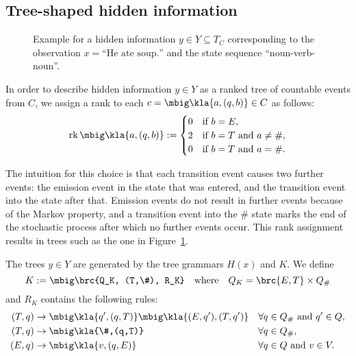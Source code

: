 \subsection{Tree-shaped hidden information}

\begin{figure}[t!]
 \centering
 \caption{Example for a hidden information $y\in Y\subseteq T_C$ corresponding
 to the observation $x = \text{``He ate soup.''}$ and the state sequence
 ``noun-verb-noun''.\label{fig:03-example-y}}
\end{figure}

In order to describe hidden information $y\in Y$ as a ranked tree of countable
events from $C$, we assign a rank to each $c = \mbig\kla{a,(q,b)}\in C$ as follows:
\begin{align*}
 \rk\mbig\kla{a,(q,b)} := \begin{cases}
  0 & \text{if } b = E, \\
  2 & \text{if } b = T \text{ and } a\neq\#, \\
  0 & \text{if } b = T \text{ and } a = \#.
 \end{cases}
\end{align*}

The intuition for this choice is that each transition event causes two further
events: the emission event in the state that was entered, and the transition
event into the state after that. Emission events do not result in further
events because of the Markov property, and a transition event into the $\#$
state marks the end of the stochastic process after which no further events
occur. This rank assignment results in trees such as the one in
Figure~\ref{fig:03-example-y}.

The trees $y\in Y$ are generated by the tree grammars $H(x)$ and $K$. We define
\[
 K := \mbig\brc{Q_K, (T,\#), R_K} \quad\text{where}\quad Q_K = \brc{E,T} \times Q_\#
\]
and $R_K$ contains the following rules:
\begin{align*}
 (T,q) &\to \mbig\kla{q',(q,T)}\mbig\kla{(E,q'),(T,q')} &&\forall q\in Q_\# \text{ and } q'\in Q, \\
 (T,q) &\to \mbig\kla{\#,(q,T)} &&\forall q\in Q_\#, \\
 (E,q) &\to \mbig\kla{v,(q,E)} &&\forall q\in Q \text{ and } v\in V.
\end{align*}

